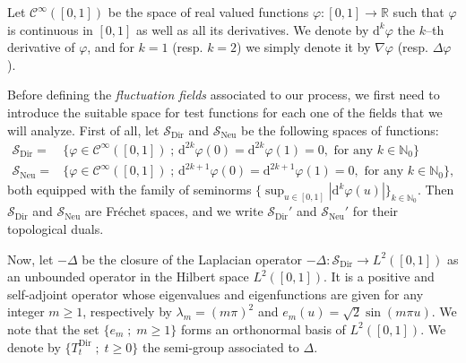 \documentclass[AHL,Unicode,longabstracts]{cedram}
\DeclareMathOperator{\Dir}{Dir}
\DeclareMathOperator{\Neu}{Neu}
\newcommand{\bb}[1]{{\mathbb #1}}
\newcommand{\mc}[1]{{\mathcal #1}}
\renewcommand{\mc}[1]{{\mathcal #1}}
\newcommand{\SD}{\ensuremath{\mc S_{\Dir}}}
\renewcommand{\geq}{\geqslant}
\renewcommand{\ge}{\geqslant}
\newcommand*{\dd}{\mathrm{d}}
\begin{document}
Let $\mc C^\infty ([0, 1])$ be the space of real valued functions $\varphi : [0, 1] \to \bb R$ such that $\varphi$ is continuous in $[0,1]$ as well as all its derivatives. We denote by $\dd^{k}\varphi$ the $k$--th derivative of $\varphi$, and for $k=1$ (resp. $k=2$) we simply denote it by $\nabla\varphi$ (resp. $\Delta\varphi$).

Before defining the \emph{fluctuation fields} associated to our process, we first need to introduce the suitable space for test functions for each one of the fields that we will analyze. First of all, let $\mc S_{\Dir}$ and $\mc S_{\Neu}$ be the following spaces of functions:
\begin{align}
\mc S_{\Dir} =&\Big\{ \varphi \in \mc C^\infty ([0, 1]) \; ; \,\dd^{2k}\varphi (0) =\dd^{2k} \varphi (1) = 0, \text{ for any }k\in\mathbb{N}_0\Big\} \label{eq:space_test_funcDir}
\\
\mc S_{\Neu} =& \Big\{\varphi \in \mc C^\infty([0,1]) \; ; \,\dd^{2k+1} \varphi(0) =\dd^{2k+1} \varphi(1) = 0, \text{ for any } k\in\mathbb{N}_0 \Big\},\label{eq:space_test_funcNeu}
\end{align}
both equipped with the family of seminorms $\{\sup_{u \in [0,1]} |\dd^k \varphi(u)|\}_{k \in \bb N_0}$. Then $\SD$ and $ \mc S_{\Neu}$ are Fr\'echet spaces, and we write $\SD'$ and $ \mc S_{\Neu}'$ for their topological duals.

Now, let $-\Delta$ be the closure of the Laplacian operator $-\Delta \colon {\mc S_{\Dir}} \to L^2([0,1]) $ as an unbounded operator in the Hilbert space $L^2([0,1])$. It is a positive and self-adjoint operator whose eigenvalues and eigenfunctions are given for any integer $m\geq 1$, respectively by $\lambda_m=(m\pi)^2$ and $e_m(u)=\sqrt{2}\sin(m\pi u)$. We note that the set $\{e_m\; ; \;m\ge 1\}$ forms an orthonormal basis of $L^2([0,1])$. We denote by $\{ T_t^{\Dir} \; ; \; t \ge 0\}$ the semi-group associated to $\Delta$.
\end{document}
